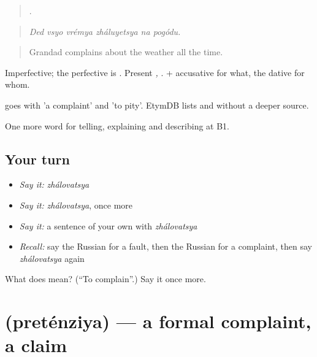 \begin{quote}
     .
\end{quote}

\begin{quote}
\emph{Ded vsyo vrémya zháluyetsya na pogódu.}
\end{quote}

\begin{quote}
Grandad complains about the weather all the time.
\end{quote}

Imperfective; the perfective is \emph{}. Present \emph{, }. \emph{} + accusative for what, the dative for whom.

\begin{cousinweb}
\emph{} goes with \emph{} 'a complaint' and \emph{} 'to pity'. EtymDB lists \emph{} and \emph{} without a deeper source.
\end{cousinweb}

\begin{grammarlens}[title={What you've built}]
One more word for telling, explaining and describing at B1.
\end{grammarlens}

\subsection*{Your turn}
\begin{itemize}
\raggedright
  \item \emph{Say it:} \emph{zhálovatsya}
  \item \emph{Say it:} \emph{zhálovatsya}, once more
  \item \emph{Say it:} a sentence of your own with \emph{zhálovatsya}
  \item \emph{Recall:} say the Russian for a fault, then the Russian for a complaint, then say \emph{zhálovatsya} again
\end{itemize}

\begin{tcolorbox}[breakable,colback=teal!4,colframe=teal!35!black,title={Before you move on}]
What does  mean? (\textquotedblleft{}To complain\textquotedblright{}.) Say it once more.
\end{tcolorbox}
\section[\texorpdfstring{\ru{претензия} (preténziya)}{претензия (preténziya)}]{ (preténziya) — a formal complaint, a claim}

